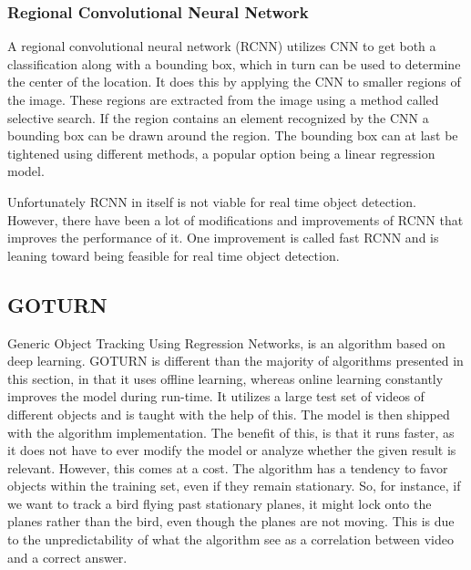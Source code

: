 \subsubsection{Regional Convolutional Neural Network}

A regional convolutional neural network (RCNN) utilizes CNN to get both a classification along with a bounding box, which in turn can be used to determine the center of the location.
It does this by applying the CNN to smaller regions of the image. 
These regions are extracted from the image using a method called selective search.
If the region contains an element recognized by the CNN a bounding box can be drawn around the region.
The bounding box can at last be tightened using different methods, a popular option being a linear regression model.\cite{CNNHistory}

Unfortunately RCNN in itself is not viable for real time object detection.
However, there have been a lot of modifications and improvements of RCNN that improves the performance of it.
One improvement is called fast RCNN and is leaning toward being feasible for real time object detection.





\subsection{GOTURN}
Generic Object Tracking Using Regression Networks, is an algorithm based on deep learning\cite{goturn}.
GOTURN is different than the majority of algorithms presented in this section, in that it uses offline learning, whereas online learning constantly improves the model during run-time.
It utilizes a large test set of videos of different objects and is taught with the help of this.
The model is then shipped with the algorithm implementation.
The benefit of this, is that it runs faster, as it does not have to ever modify the model or analyze whether the given result is relevant.
However, this comes at a cost. 
The algorithm has a tendency to favor objects within the training set, even if they remain stationary.
So, for instance, if we want to track a bird flying past stationary planes, it might lock onto the planes rather than the bird, even though the planes are not moving.
This is due to the unpredictability of what the algorithm see as a correlation between video and a correct answer.


